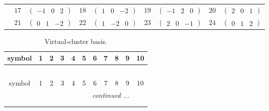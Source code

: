 \documentclass[fleqn,10pt,landscape]{article}
\begin{document}
\begin{itemize}
{\begin{center}
\begin{longtable}{ccccccccc}
& $ 17 $ & $ \begin{pmatrix} -1 & 0 & 2 \end{pmatrix} $ & $ 18 $ & $ \begin{pmatrix} 1 & 0 & -2 \end{pmatrix} $ & $ 19 $ & $ \begin{pmatrix} -1 & 2 & 0 \end{pmatrix} $ & $ 20 $ & $ \begin{pmatrix} 2 & 0 & 1 \end{pmatrix} $ \\
& $ 21 $ & $ \begin{pmatrix} 0 & 1 & -2 \end{pmatrix} $ & $ 22 $ & $ \begin{pmatrix} 1 & -2 & 0 \end{pmatrix} $ & $ 23 $ & $ \begin{pmatrix} 2 & 0 & -1 \end{pmatrix} $ & $ 24 $ & $ \begin{pmatrix} 0 & 1 & 2 \end{pmatrix} $ \\
\end{longtable}
\end{center}
\begin{center}
\renewcommand{\arraystretch}{1.7}
\begin{longtable}{ccccccccccc}
\caption{Virtual-cluster basis.}
 \\
 \hline \hline
symbol & 1 & 2 & 3 & 4 & 5 & 6 & 7 & 8 & 9 & 10 \\ \hline \endfirsthead

\multicolumn{10}{l}{\tablename\ \thetable{}} \\
 \hline \hline
symbol & 1 & 2 & 3 & 4 & 5 & 6 & 7 & 8 & 9 & 10 \\ \hline \endhead

 \hline \hline
\multicolumn{10}{r}{\footnotesize\it continued ...} \\ \endfoot

 \hline \hline
\multicolumn{10}{r}{} \\ \endlastfoot


\end{longtable}
\end{center}}
\end{itemize}
\end{document}

